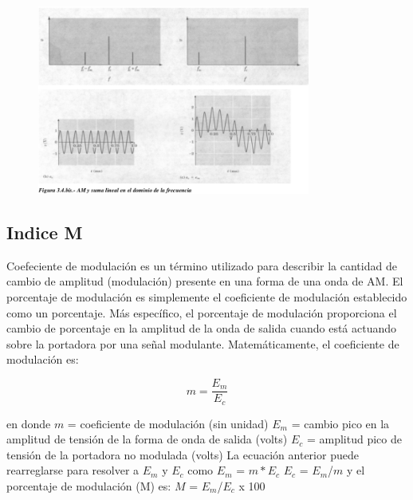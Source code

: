 \documentclass[a4paper,12pt,twoside]{article}
\begin{document}
\begin{figure}[H]
    \centering
    \includegraphics[width=0.8\textwidth]{../img/am4.png}
\end{figure}

\subsection{Indice M}

Coefeciente de modulación es un término utilizado para describir la cantidad de cambio de amplitud (modulación)
 presente en una forma de una onda de AM. El porcentaje de modulación es simplemente el coeficiente de modulación establecido como un porcentaje.
 Más específico, el porcentaje de modulación proporciona el cambio de porcentaje en la amplitud de la onda de salida cuando está actuando sobre la portadora por una señal modulante. Matemáticamente, el coeficiente de modulación es:

\begin{equation*}
m=\frac{E_m}{E_c}
\end{equation*}

en donde
\newline
$m$ = coeficiente de modulación (sin unidad)
\newline
$E_m$ = cambio pico en la amplitud de tensión de la forma de onda de salida (volts)
\newline
$E_c$ = amplitud pico de tensión de la portadora no modulada (volts)
La ecuación anterior puede rearreglarse para resolver a $E_m$ y $E_c$ como
\newline
$E_m$ = $m*E_c$ 
\newline
$E_c$ = $E_m$/$m$ 
\newline
y el porcentaje de modulación (M) es:
\newline 
$M$ = $E_m$/$E_c$ x 100
\end{document}
